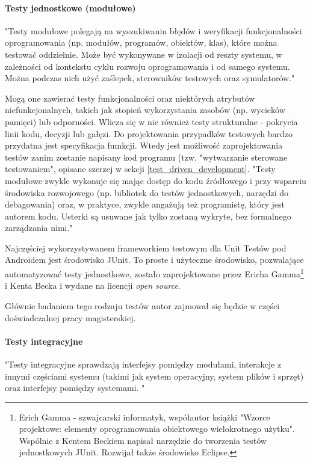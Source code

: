 \paragraph{Testy jednostkowe (modułowe)}


"Testy modułowe polegają na wyszukiwaniu błędów i weryfikacji funkcjonalności oprogramowania (np. modułów, programów, obiektów, klas), które można testować
oddzielnie. Może być wykonywane w izolacji od reszty systemu, w zależności od kontekstu cyklu rozwoju oprogramowania i od samego systemu. Można podczas nich użyć zaślepek, sterowników testowych oraz symulatorów." \cite{bib:sylabus:foundation}

Mogą one zawierać testy funkcjonalności oraz niektórych atrybutów niefunkcjonalnych, takich jak stopień wykorzystania zasobów (np. wycieków pamięci) lub odporności. Wlicza się w nie również testy strukturalne - pokrycia linii kodu, decyzji lub gałęzi. Do projektowania przypadków testowych bardzo przydatna jest specyfikacja fumkcji. Wtedy jest możliwość zaprojektowania testów zanim zostanie napisany kod programu (tzw. "wytwarzanie sterowane testowaniem", opisane szerzej w sekcji \ref{test_driven_development}. "Testy modułowe zwykle wykonuje się mając dostęp do kodu źródłowego i przy wsparciu środowiska rozwojowego (np. bibliotek do testów jednostkowych, narzędzi do debagowania) oraz, w praktyce, zwykle angażują też programistę, który jest autorem kodu. Usterki są usuwane jak tylko zostaną wykryte, bez formalnego zarządzania nimi."   \cite{bib:sylabus:foundation}

Najczęściej wykorzystywanem frameworkiem testowym dla Unit Testów pod Androidem jest środowisko JUnit. To proste i użyteczne środowisko, pozwalające automatyzować testy jednostkowe, zostało zaprojektowane przez Ericha Gamma\footnote{Erich Gamma - szwajcarski informatyk, współautor książki "Wzorce projektowe: elementy oprogramowania obiektowego wielokrotnego użytku". Wspólnie z Kentem Beckiem napisał narzędzie do tworzenia testów jednostkowych JUnit. Rozwijał także środowisko Eclipse.} i Kenta Becka i wydane na licencji \textit{open source}.

Głównie badaniem tego rodzaju testów autor zajmował się będzie w części doświadczalnej pracy magisterskiej.

\paragraph{Testy integracyjne}

"Testy integracyjne sprawdzają interfejsy pomiędzy modułami, interakcje z innymi częściami systemu (takimi jak system operacyjny, system plików i sprzęt) oraz interfejsy pomiędzy systemami. "\cite{bib:sylabus:foundation}

